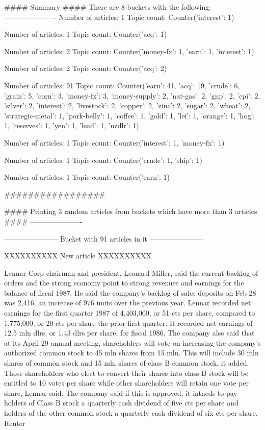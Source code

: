 \documentclass{article}
\begin{document}
\begin{pythonOutput}
#### Summary ####
There are 8 buckets with the following:
----------------------
Number of articles: 1
Topic count: Counter({'interest': 1})

Number of articles: 1
Topic count: Counter({'acq': 1})

Number of articles: 2
Topic count: Counter({'money-fx': 1, 'earn': 1, 'interest': 1})

Number of articles: 2
Topic count: Counter({'acq': 2})

Number of articles: 91
Topic count: Counter({'earn': 41, 'acq': 19, 'crude': 6, 'grain': 5, 'corn': 3, 'money-fx': 3, 'money-supply': 2, 'nat-gas': 2, 'gnp': 2, 'cpi': 2, 'silver': 2, 'interest': 2, 'livestock': 2, 'copper': 2, 'zinc': 2, 'sugar': 2, 'wheat': 2, 'strategic-metal': 1, 'pork-belly': 1, 'coffee': 1, 'gold': 1, 'lei': 1, 'orange': 1, 'hog': 1, 'reserves': 1, 'yen': 1, 'lead': 1, 'nzdlr': 1})

Number of articles: 1
Topic count: Counter({'interest': 1, 'money-fx': 1})

Number of articles: 1
Topic count: Counter({'crude': 1, 'ship': 1})

Number of articles: 1
Topic count: Counter({'earn': 1})

#################

#### Printing 3 random articles from buckets which have more than 3 articles ####
----------------------

-----------------------
Bucket with 91 articles in it
-----------------------


XXXXXXXXXX
New article
XXXXXXXXXX

Lennar Corp chairman and president,
Leonard Miller, said the current backlog of orders and the
strong economy point to strong revenues and earnings for the
balance of fiscal 1987.
    He said the company's backlog of sales deposits on Feb 28
was 2,416, an increase of 976 units over the previous year.
    Lennar recorded net earnings for the first quarter 1987 of
4,403,000, or 51 cts per share, compared to 1,775,000, or 20
cts per share the prior first quarter. It recorded net earnings
of 12.5 mln dlrs, or 1.43 dlrs per share, for fiscal 1986.
    The company also said that at its April 29 annual meeting,
shareholders will vote on increasing the company's authorized
common stock to 45 mln shares from 15 mln. This will include 30
mln shares of common stock and 15 mln shares of class B common
stock, it added.
    Those shareholders who elect to convert their shares into
class B stock will be entitled to 10 votes per share while
other shareholders will retain one vote per share, Lennar said.
    The company said if this is approved, it intneds to pay
holders of Class B stock a quarterly cash dividend of five cts
per share and holders of the other common stock a quarterly
cash dividend of six cts per share.
 Reuter


\end{pythonOutput}
\end{document}
